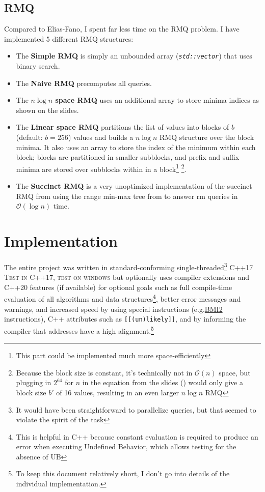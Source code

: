\documentclass[a4paper,UKenglish,cleveref, autoref, thm-restate]{lipics-v2021}
\newcommand{\todo}[1] {{\color{red}\textsc{#1}}}
\begin{document}
\subsection{RMQ}
Compared to Elias-Fano, I spent far less time on the RMQ problem.
I have implemented 5 different RMQ structures:
\begin{itemize}
    \item The \textbf{Simple RMQ} is simply an unbounded array (\textit{\texttt{std::vector}}) that uses binary search.
    \item The \textbf{Naive RMQ} precomputes all queries.
    \item The \textbf{$n \log n$ space RMQ} uses an additional array to store minima indices as shown on the slides.
    \item The \textbf{Linear space RMQ} partitions the list of values into blocks of $b$ (default: $b=256$) values
    and builds a $n \log n$ RMQ structure over the block minima.
    It also uses an array to store the index of the minimum within each block; blocks are partitioned in smaller subblocks,
    and prefix and suffix minima are stored over subblocks within in a block\footnote{This part could be implemented much more space-efficiently} \footnote{Because the block size is constant, it's technically not in $\mathcal O(n)$ space,
    but plugging in $2^{64}$ for $n$ in the equation from the slides (\cite{folien}) would only give a block size $b'$ of 16 values, resulting in an even larger $n \log n$ RMQ}.
    \item The \textbf{Succinct RMQ} is a very unoptimized implementation of the succinct RMQ from \cite{succinctRmq}
    using the range min-max tree from \cite{simpleEfficient} to answer rm queries in $\mathcal O(\log n)$ time.
\end{itemize}

\section{Implementation}
The entire project was written in standard-conforming single-threaded\footnote{It would have been straightforward to parallelize queries,
but that seemed to violate the spirit of the task} C++17 \todo{Test in C++17, test on windows} but optionally uses compiler extensions
and C++20 features (if available) for optional goals such as full compile-time evaluation of all algorithms and data structures\footnote{This
is helpful in C++ because constant evaluation is required to produce an error when executing Undefined Behavior,
which allows testing for the absence of UB}, better error messages and warnings,
and increased speed by using special instructions (e.g.\@ \href{https://en.wikipedia.org/wiki/X86_Bit_manipulation_instruction_set#BMI2_(Bit_Manipulation_Instruction_Set_2)}{BMI2} instructions),
C++ attributes such as \texttt{[[(un)likely]]}, and by informing the compiler that addresses have a high alignment.\footnote{To keep this document relatively short, I don't go into details of the individual implementation.}
\end{document}
